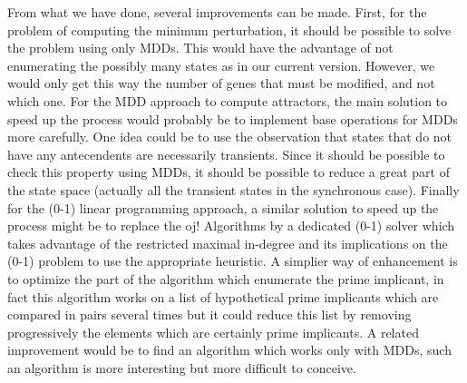 \documentclass[a4paper,11pt]{article}
\begin{document}
From what we have done, several improvements can be made. First, for the problem
of computing the minimum perturbation, it should be possible to solve the
problem using only MDDs. This would have the advantage of not enumerating the
possibly many states as in our current version. However, we would only get this
way the number of genes that must be modified, and not which one.
For the MDD approach to compute attractors, the main solution to speed up the
process would probably be to implement base operations for MDDs more carefully.
One idea could be to use the observation that states that do not have any
antecendents are necessarily transients. Since it should be possible to check
this property using MDDs, it should be possible to reduce a great part of the
state space (actually all the transient states in the synchronous case).
Finally for the (0-1) linear programming approach, a similar solution to speed
up the process might be to replace the oj! Algorithms by a dedicated (0-1)
solver which takes advantage of the restricted maximal in-degree and its
implications on the (0-1) problem to use the appropriate heuristic. A simplier
way of enhancement is to optimize the part of the algorithm which enumerate the
prime implicant, in fact this algorithm works on a list of hypothetical prime
implicants which are compared in pairs several times but it could reduce this
list by removing progressively the elements which are certainly prime
implicants. A related improvement would be to find an algorithm which works
only with MDDs, such an algorithm is more interesting but more difficult to
conceive.





\end{document}
